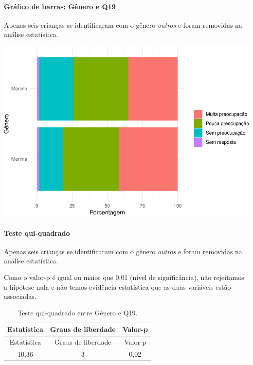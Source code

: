 \documentclass[]{article}
\let\oldparagraph\paragraph
\renewcommand{\paragraph}[1]{\oldparagraph{#1}\mbox{}}
\begin{document}
\hypertarget{gruxe1fico-de-barras-guxeanero-e-q19}{%
\paragraph{Gráfico de barras: Gênero e Q19}\label{gruxe1fico-de-barras-guxeanero-e-q19}}

Apenas seis crianças se identificaram com o gênero \emph{outros} e foram removidas na análise estatística.

\begin{center}\includegraphics[width=0.75\linewidth]{relatorio_covid19_files/figure-latex/unnamed-chunk-318-1} \end{center}

\hypertarget{teste-qui-quadrado-28}{%
\paragraph{Teste qui-quadrado}\label{teste-qui-quadrado-28}}

Apenas seis crianças se identificaram com o gênero \emph{outros} e foram removidas na análise estatística.

Como o valor-p é igual ou maior que 0.01 (nível de significância), não rejeitamos a hipótese nula e não temos evidência estatística que as duas variáveis estão associadas.

\begin{longtable}[]{@{}ccc@{}}
\caption{\label{tab:unnamed-chunk-320}Teste qui-quadrado entre Gênero e Q19.}\tabularnewline
\toprule
Estatística & Graus de liberdade & Valor-p\tabularnewline
\midrule
\endfirsthead
\toprule
Estatística & Graus de liberdade & Valor-p\tabularnewline
\midrule
\endhead
10,36 & 3 & 0,02\tabularnewline
\bottomrule
\end{longtable}

\cleardoublepage
\end{document}
